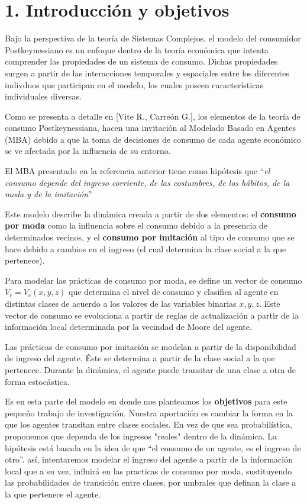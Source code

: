 \documentclass[letterpaper,12pt]{article}
\begin{document}
 
\section*{1. Introducción y objetivos}

Bajo la perspectiva de la teoría de Sistemas Complejos, el modelo del consumidor Postkeynessiano es un enfoque dentro de la teoría económica que intenta comprender las propiedades de un sistema de consumo. Dichas propiedades surgen a partir de las interacciones temporales y espaciales entre los diferentes indivduos que participan en el modelo, los cuales poseen características individuales diversas.

Como se presenta a detalle en [Vite R., Carreón G.], los elementos de la teoría de consumo Postkeynessiana, hacen una invitación al Modelado Basado en Agentes (MBA) debido a que la toma de decisiones de consumo de cada agente económico se ve afectada por la influencia de su entorno.

El MBA presentado en la referencia anterior tiene como hipótesis que ``\textit{el consumo depende del ingreso corriente, de las costumbres, de los hábitos, de la moda y de la imitación}''

Este modelo describe la dinámica creada a partir de dos elementos: el \textbf{consumo por moda} como la influencia sobre el consumo debido a la presencia  de determinados vecinos, y el \textbf{consumo por imitación} al tipo de consumo que se hace debido a cambios en el ingreso (el cual determina la clase social a la que pertenece).

Para modelar las prácticas de consumo por moda, se define un vector de consumo $V_c=V_c(x,y,z)$ que determina el nivel de consumo y clasifica al agente en distintas clases de acuerdo a los valores de las variables binarias $x,y,z$. Este vector de consumo se evoluciona a partir de reglas de actualización a partir de la información local determinada por la vecindad de Moore del agente.

Las prácticas de consumo por imitación se modelan a partir de la disponibilidad  de ingreso del agente. Éste se determina a partir de la clase social a la que pertenece. Durante la dinámica, el agente puede transitar de una clase a otra de forma estocástica.

Es en esta parte del modelo en donde nos planteamos los \textbf{objetivos} para este pequeño trabajo de investigación. Nuestra aportación es cambiar la forma en la que los agentes transitan entre clases sociales. En vez de que sea probabilística, proponemos que dependa de los ingresos "reales" dentro de la dinámica. La hipótesis está basada en la idea de que ``el consumo de un agente, es el ingreso de otro''. así,  intentaremos modelar el ingreso del agente a  partir de la información local que a su vez, influirá en las practicas de consumo por moda, sustituyendo las probabilidades de transición entre clases, por umbrales que definan la clase a la que pertenece el agente. 
\end{document}
